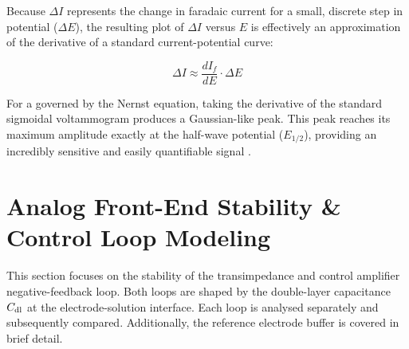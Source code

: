 Because $\Delta I$ represents the change in faradaic current for a small, discrete step in potential ($\Delta E$), the resulting plot of $\Delta I$ versus $E$ is effectively an approximation of the derivative of a standard current-potential curve:

\begin{equation}
\Delta I \approx \frac{dI_f}{dE} \cdot \Delta E
\end{equation}

For a  governed by the Nernst equation, taking the derivative of the standard sigmoidal voltammogram produces a Gaussian-like peak. This peak reaches its maximum amplitude exactly at the half-wave potential ($E_{1/2}$), providing an incredibly sensitive and easily quantifiable signal \cite{Laborda2014}.


\section{Analog Front-End Stability \& Control Loop Modeling}
\label{sec:afe-stability}
 
This section focuses on the stability of the transimpedance and control amplifier negative-feedback loop. Both loops are shaped by the double-layer capacitance $C_{\mathrm{dl}}$ at the electrode-solution interface. Each loop is analysed separately and subsequently compared. Additionally, the reference electrode buffer is covered in brief detail.

